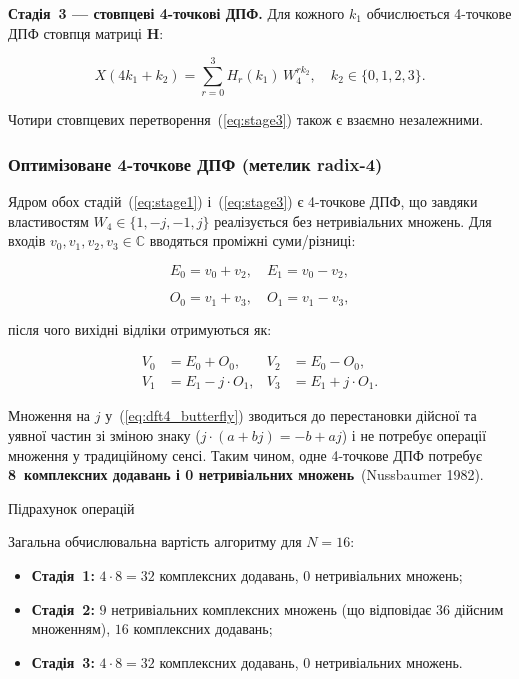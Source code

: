 \textbf{Стадія~3 --- стовпцеві 4-точкові ДПФ.} Для кожного \(k_{1}\)
обчислюється 4-точкове ДПФ стовпця матриці \(\mathbf{H}\):

\[X(4k_{1} + k_{2}) = \sum_{r = 0}^{3}H_{r}(k_{1})\, W_{4}^{rk_{2}},\quad k_{2} \in \{ 0,1,2,3\}.\]

Чотири стовпцевих перетворення~(\hyperref[eq:stage3]{{[}eq:stage3{]}})
також є взаємно незалежними.

\subsubsection{Оптимізоване 4-точкове ДПФ (метелик
radix-4)}\label{ux43eux43fux442ux438ux43cux456ux437ux43eux432ux430ux43dux435-4-ux442ux43eux447ux43aux43eux432ux435-ux434ux43fux444-ux43cux435ux442ux435ux43bux438ux43a-radix-4}

Ядром обох стадій~(\hyperref[eq:stage1]{{[}eq:stage1{]}})
і~(\hyperref[eq:stage3]{{[}eq:stage3{]}}) є 4-точкове ДПФ, що завдяки
властивостям \(W_{4} \in \{ 1, - j, - 1,j\}\) реалізується без
нетривіальних множень. Для входів
\(v_{0},v_{1},v_{2},v_{3}\mathbb{\in C}\) вводяться проміжні
суми/різниці:

\[E_{0} = v_{0} + v_{2},\quad E_{1} = v_{0} - v_{2},\]

\[O_{0} = v_{1} + v_{3},\quad O_{1} = v_{1} - v_{3},\]

після чого вихідні відліки отримуються як:

\[\begin{aligned}
V_{0} & = E_{0} + O_{0}, & V_{2} & = E_{0} - O_{0}, \\
V_{1} & = E_{1} - j \cdot O_{1}, & V_{3} & = E_{1} + j \cdot O_{1}.
\end{aligned}\]

Множення на \(j\)
у~(\hyperref[eq:dft4_butterfly]{{[}eq:dft4\_butterfly{]}}) зводиться до
перестановки дійсної та уявної частин зі зміною знаку
(\(j \cdot (a + bj) = - b + aj\)) і не потребує операції множення у
традиційному сенсі. Таким чином, одне 4-точкове ДПФ потребує
\textbf{8~комплексних додавань і 0 нетривіальних множень}~(Nussbaumer
1982).

Підрахунок операцій

Загальна обчислювальна вартість алгоритму для \(N = 16\):

\begin{itemize}
\item
  \textbf{Стадія~1:} \(4 \cdot 8 = 32\) комплексних додавань, \(0\)
  нетривіальних множень;
\item
  \textbf{Стадія~2:} \(9\) нетривіальних комплексних множень (що
  відповідає \(36\) дійсним множенням), \(16\) комплексних додавань;
\item
  \textbf{Стадія~3:} \(4 \cdot 8 = 32\) комплексних додавань, \(0\)
  нетривіальних множень.
\end{itemize}

